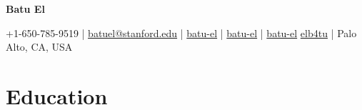 \documentclass[a4paper,11pt]{article}
\newcommand{\socialicon}[1]{\raisebox{-0.05em}{\resizebox{!}{1em}{#1}}}
\newcommand{\headerfontiii}{\fontfamily{ppl}\selectfont} %
\begin{document}
\headerfontiii

\begin{center}
    {\Huge\textbf{Batu El}}
\end{center}
\vspace{-5mm}

\begin{center}
    \small{
    +1-650-785-9519 | \href{mailto:batuel@stanford.edu}{batuel@stanford.edu} | 
    \href{https://batu-el.github.io/home/}{batu-el}} |
    \socialicon{\faLinkedin} \href{https://www.linkedin.com/in/batu-el/}{batu-el} | 
    \socialicon{\faGithub} \href{https://github.com/batu-el}{batu-el} 
    \socialicon{\faTwitter} \href{https://twitter.com/elb4tu}{elb4tu} |
    \small{Palo Alto, CA, USA}
\end{center}
\vspace{-4mm}


    



\section{\textbf{Education}}
\vspace{-0.4mm}
\end{document}
